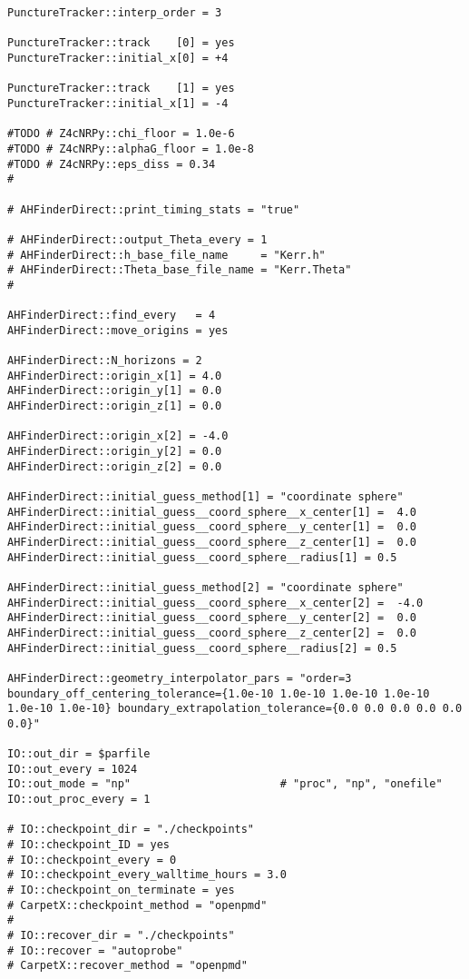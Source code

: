 \begin{verbatim}
PunctureTracker::interp_order = 3

PunctureTracker::track    [0] = yes
PunctureTracker::initial_x[0] = +4

PunctureTracker::track    [1] = yes
PunctureTracker::initial_x[1] = -4

#TODO # Z4cNRPy::chi_floor = 1.0e-6
#TODO # Z4cNRPy::alphaG_floor = 1.0e-8
#TODO # Z4cNRPy::eps_diss = 0.34
#

# AHFinderDirect::print_timing_stats = "true"

# AHFinderDirect::output_Theta_every = 1
# AHFinderDirect::h_base_file_name     = "Kerr.h"
# AHFinderDirect::Theta_base_file_name = "Kerr.Theta"
#

AHFinderDirect::find_every   = 4
AHFinderDirect::move_origins = yes

AHFinderDirect::N_horizons = 2
AHFinderDirect::origin_x[1] = 4.0
AHFinderDirect::origin_y[1] = 0.0
AHFinderDirect::origin_z[1] = 0.0

AHFinderDirect::origin_x[2] = -4.0
AHFinderDirect::origin_y[2] = 0.0
AHFinderDirect::origin_z[2] = 0.0

AHFinderDirect::initial_guess_method[1] = "coordinate sphere"
AHFinderDirect::initial_guess__coord_sphere__x_center[1] =  4.0
AHFinderDirect::initial_guess__coord_sphere__y_center[1] =  0.0
AHFinderDirect::initial_guess__coord_sphere__z_center[1] =  0.0
AHFinderDirect::initial_guess__coord_sphere__radius[1] = 0.5

AHFinderDirect::initial_guess_method[2] = "coordinate sphere"
AHFinderDirect::initial_guess__coord_sphere__x_center[2] =  -4.0
AHFinderDirect::initial_guess__coord_sphere__y_center[2] =  0.0
AHFinderDirect::initial_guess__coord_sphere__z_center[2] =  0.0
AHFinderDirect::initial_guess__coord_sphere__radius[2] = 0.5

AHFinderDirect::geometry_interpolator_pars = "order=3 boundary_off_centering_tolerance={1.0e-10 1.0e-10 1.0e-10 1.0e-10 1.0e-10 1.0e-10} boundary_extrapolation_tolerance={0.0 0.0 0.0 0.0 0.0 0.0}"

IO::out_dir = $parfile
IO::out_every = 1024
IO::out_mode = "np"                       # "proc", "np", "onefile"
IO::out_proc_every = 1

# IO::checkpoint_dir = "./checkpoints"
# IO::checkpoint_ID = yes
# IO::checkpoint_every = 0
# IO::checkpoint_every_walltime_hours = 3.0
# IO::checkpoint_on_terminate = yes
# CarpetX::checkpoint_method = "openpmd"
# 
# IO::recover_dir = "./checkpoints"
# IO::recover = "autoprobe"
# CarpetX::recover_method = "openpmd"


\end{verbatim}
